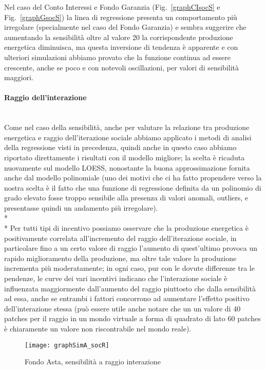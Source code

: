 \documentclass[12pt,a4paper,openright,twoside]{report}
\newcommand{\myparagraph}[1]{\paragraph{#1}\mbox{}\\}
\begin{document}
Nel caso del Conto Interessi e Fondo Garanzia (Fig.~\ref{graphCIsocS} e Fig.~\ref{graphGsocS}) la linea di regressione presenta un comportamento più irregolare (specialmente nel caso del Fondo Garanzia) e sembra suggerire che aumentando la sensibilità oltre al valore 20 la corrispondente produzione energetica diminuisca, ma questa inversione di tendenza è apparente e con ulteriori simulazioni abbiamo provato che la funzione continua ad essere crescente, anche se poco e con notevoli oscillazioni, per valori di sensibilità maggiori.

\myparagraph{Raggio dell'interazione}

Come nel caso della sensibilità, anche per valutare la relazione tra produzione energetica e raggio dell'iterazione sociale abbiamo applicato i metodi di analisi della regressione visti in precedenza, quindi anche in questo caso abbiamo riportato direttamente i risultati con il modello migliore; la scelta è ricaduta nuovamente sul modello LOESS, nonostante la buona approssimazione fornita anche dal modello polinomiale (uno dei motivi che ci ha fatto propendere verso la nostra scelta è il fatto che una funzione di regressione definita da un polinomio di grado elevato fosse troppo sensibile alla presenza di valori anomali, outliers, e presentasse quindi un andamento più irregolare).\\* \\*
Per tutti tipi di incentivo possiamo osservare che la produzione energetica è positivamente correlata all'incremento del raggio dell'iterazione sociale, in particolare fino a un certo valore di raggio l'aumento di quest'ultimo provoca un rapido miglioramento della produzione, ma oltre tale valore la produzione incrementa più moderatamente; in ogni caso, pur con le dovute differenze tra le pendenze, le curve dei vari incentivi indicano che l'interazione sociale è influenzata maggiormente dall'aumento del raggio piuttosto che dalla sensibilità ad essa, anche se entrambi i fattori concorrono ad aumentare l'effetto positivo dell'interazione stessa (può essere utile anche notare che un un valore di 40 patches per il raggio in un mondo virtuale a forma di quadrato di lato 60 patches è chiaramente un valore non riscontrabile nel mondo reale).

\begin{figure}[H]
	\centering
	\texttt{[image: graphSimA\_socR]}
	\caption{Fondo Asta, sensibilità a raggio interazione}
	\label{graphAsocR}
\end{figure}
\end{document}
